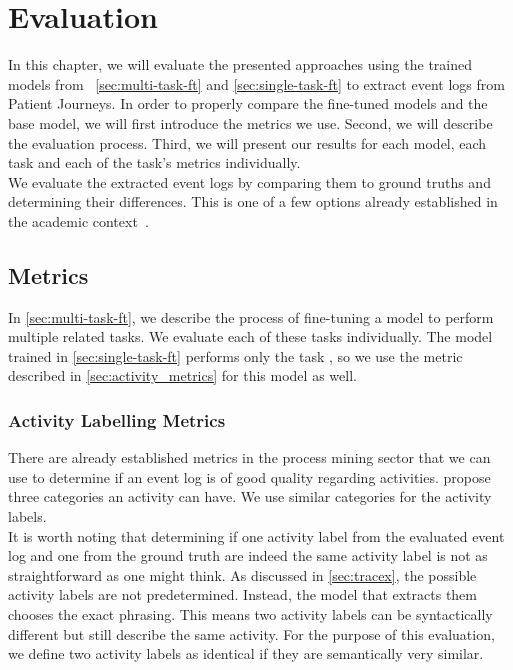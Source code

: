 \section{Evaluation}\label{sec:eval}
In this chapter, we will evaluate the presented approaches using the trained models from ~\autoref{sec:multi-task-ft} and \autoref{sec:single-task-ft} to extract event logs from Patient Journeys. In order to properly compare the fine-tuned models and the base model, we will first introduce the metrics we use. Second, we will describe the evaluation process. Third, we will present our results for each model, each task and each of the task's metrics individually.\\
We evaluate the extracted event logs by comparing them to ground truths and determining their differences. This is one of a few options already established in the academic context~\cite{latif_fine-tuning_2024}.

\subsection{Metrics}\label{sec:metrics}
In \autoref{sec:multi-task-ft}, we describe the process of fine-tuning a model to perform multiple related tasks. We evaluate each of these tasks individually. The model trained in \autoref{sec:single-task-ft} performs only the task , so we use the metric described in \autoref{sec:activity_metrics} for this model as well.

\subsubsection{Activity Labelling Metrics}\label{sec:activity_metrics}
There are already established metrics in the process mining sector that we can use to determine if an event log is of good quality regarding activities. \cite{van_der_aalst_process_2016, carmona_conformance_2018} propose three categories an activity can have. We use similar categories for the activity labels.\\
It is worth noting that determining if one activity label from the evaluated event log and one from the ground truth are indeed the same activity label is not as straightforward as one might think. As discussed in \autoref{sec:tracex}, the possible activity labels are not predetermined. Instead, the model that extracts them chooses the exact phrasing. This means two activity labels can be syntactically different but still describe the same activity. For the purpose of this evaluation, we define two activity labels as identical if they are semantically very similar.
